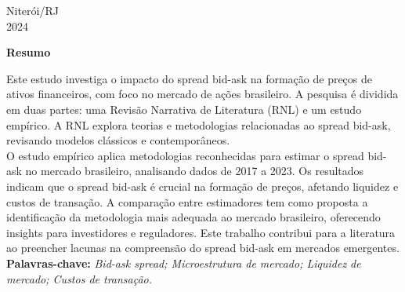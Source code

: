     \begin{center}
        Niterói/RJ\\[0.2cm]
        2024 
    \end{center}
    
    \newpage
    
    \begin{center}
        \textbf{\Large Resumo}\\[0.2cm]
    \end{center}
    
    
    
    \begin{flushleft}
        \setlength{\parskip}{1cm} %
        \linespread{1.5}\selectfont %
        \hspace*{0cm}\parbox{16.5cm}{
            Este estudo investiga o impacto do spread bid-ask na formação de preços de ativos financeiros, com foco no mercado de ações brasileiro. A pesquisa é dividida em duas partes: uma Revisão Narrativa de Literatura (RNL) e um estudo empírico. A RNL explora teorias e metodologias relacionadas ao spread bid-ask, revisando modelos clássicos e contemporâneos.
            \\O estudo empírico aplica metodologias reconhecidas para estimar o spread bid-ask no mercado brasileiro, analisando dados de 2017 a 2023. Os resultados indicam que o spread bid-ask é crucial na formação de preços, afetando liquidez e custos de transação. A comparação entre estimadores tem como proposta a identificação da metodologia mais adequada ao mercado brasileiro, oferecendo insights para investidores e reguladores. Este trabalho contribui para a literatura ao preencher lacunas na compreensão do spread bid-ask em mercados emergentes.
            \\
            \linespread{1.5}\selectfont
            \textbf{Palavras-chave:} \textit{Bid-ask spread; Microestrutura de mercado; Liquidez de mercado; Custos de transação.}
        }
    \end{flushleft}
    \newpage
    
    
    
    
    
    
    
    
    
    
    
    \thispagestyle{empty}
    
        
    